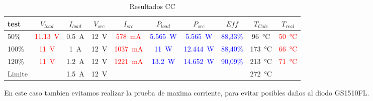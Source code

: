 
\begin{table}[H]
    \centering
    \renewcommand\theadfont{\bfseries}
    \setlength{\tabcolsep}{10pt}
    \renewcommand{\arraystretch}{1.5}
    \begin{tabular}{|l|c|c|c|c|c|c|c|c|c|}
        \hline
        test   & $V_{load}$ & $I_{load}$        & $V_{src}$      & $I_{src}$         & $P_{load}$ & $P_{src}$ & $Eff$ & $T_{Calc}$         & $T_{real}$ \\ \hline
        50\%   & \textcolor{red}{\SI{11,13}{\volt}}& \SI{0.5}{\ampere} & \SI{12}{\volt} & \textcolor{red}{\SI{578}{\milli\ampere}}                   & \textcolor{blue}{\SI{5,565}{\watt}}                       & \textcolor{blue}{\SI{5,565}{\watt}} & \textcolor{blue}{88,33\%}       & \SI{96}{\celsius}  & \textcolor{red}{\SI{50}{\celsius}}\\ \hline

        100\%   & \textcolor{red}{\SI{11}{\volt}}& \SI{1}{\ampere} & \SI{12}{\volt} & \textcolor{red}{\SI{1037}{\milli\ampere}}                   & \textcolor{blue}{\SI{11}{\watt}}                       & \textcolor{blue}{\SI{12,444}{\watt}} & \textcolor{blue}{88,40\%}       & \SI{173}{\celsius}  & \textcolor{red}{\SI{66}{\celsius}}\\ \hline

        120\%   & \textcolor{red}{\SI{11}{\volt}}& \SI{1.2}{\ampere} & \SI{12}{\volt} & \textcolor{red}{\SI{1221}{\milli\ampere}}                   & \textcolor{blue}{\SI{13,2}{\watt}}                       & \textcolor{blue}{\SI{14,652}{\watt}} & \textcolor{blue}{90,09\%}       & \SI{213}{\celsius}  & \textcolor{red}{\SI{71}{\celsius}}\\ \hline
       Limite &            & \SI{1.5}{\ampere}                 & \SI{12}{\volt} & &            &           &       & \SI{272}{\celsius} &            \\
        \hline
    \end{tabular}

    \caption{Resultados CC}
    \label{tab:CcResTable}
\end{table}

En este caso tambien evitamos realizar la prueba de maxima corriente, para evitar posibles daños al diodo GS1510FL.
